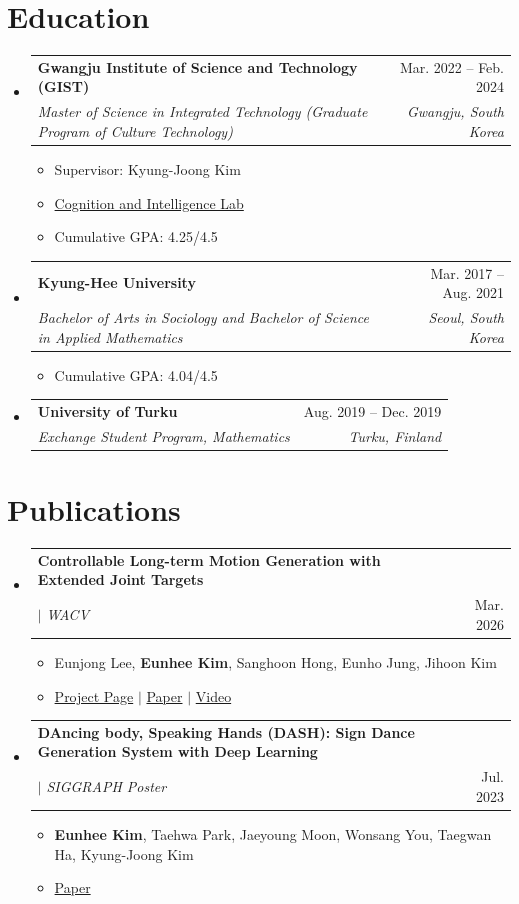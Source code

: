 \documentclass[letterpaper,11pt]{article}
\makeatletter
\newcommand{\resumeItem}[1]{
  \item\small{
    {#1 \vspace{-2pt}}
  }
}
\newcommand{\resumeSubheading}[4]{
  \vspace{-2pt}\item
    \begin{tabular*}{0.97\textwidth}[t]{l@{\extracolsep{\fill}}r}
      \textbf{#1} & #2 \\
      \textit{\small#3} & \textit{\small #4} \\
    \end{tabular*}\vspace{-7pt}
}
\newcommand{\resumeProjectHeading}[2]{
    \item
    \begin{tabular*}{0.97\textwidth}{l@{\extracolsep{\fill}}r}
      \small#1 & #2 \\
    \end{tabular*}\vspace{-7pt}
}
\newcommand{\resumeSubHeadingListStart}{\begin{itemize}[leftmargin=0.15in, label={}]}
\newcommand{\resumeSubHeadingListEnd}{\end{itemize}}
\newcommand{\resumeItemListStart}{\begin{itemize}}
\newcommand{\resumeItemListEnd}{\end{itemize}\vspace{-5pt}}
\makeatother
\begin{document}
\section{Education}
  \resumeSubHeadingListStart
    \resumeSubheading
      {Gwangju Institute of Science and Technology (GIST)}{Mar. 2022 -- Feb. 2024}
      {Master of Science in Integrated Technology (Graduate Program of Culture Technology)}{Gwangju, South Korea}
        \resumeItemListStart
          \resumeItem{Supervisor: Kyung-Joong Kim}
          \resumeItem{\href{https://cilab.gist.ac.kr/hp/}{Cognition and Intelligence Lab}}
          \resumeItem{Cumulative GPA: 4.25/4.5}
        \resumeItemListEnd
    \resumeSubheading
      {Kyung-Hee University}{Mar. 2017 -- Aug. 2021}
      {Bachelor of Arts in Sociology and Bachelor of Science in Applied Mathematics}{Seoul, South Korea}
      \resumeItemListStart
        \resumeItem{Cumulative GPA: 4.04/4.5}
      \resumeItemListEnd
    \resumeSubheading
      {University of Turku}{Aug. 2019 -- Dec. 2019}
      {Exchange Student Program, Mathematics}{Turku, Finland}
  \resumeSubHeadingListEnd

      


\section{Publications}
    \resumeSubHeadingListStart
      \resumeProjectHeading
          {\textbf{Controllable Long-term Motion Generation with Extended Joint Targets} 
          \\$|$ \emph{WACV}}{Mar. 2026}
          \resumeItemListStart
            \resumeItem{Eunjong Lee, \textbf{Eunhee Kim}, Sanghoon Hong, Eunho Jung, Jihoon Kim}
            \resumeItem{\href{https://comet-proj.github.io}{Project Page} $|$ \href{https://openaccess.thecvf.com/content/WACV2026/html/Lee_Controllable_Long-term_Motion_Generation_with_Extended_Joint_Targets_WACV_2026_paper.html}{Paper} $|$ \href{https://youtu.be/vZh8PwArOe0?si=MOItkrb3HT2LwRAU}{Video}}
          \resumeItemListEnd
      \resumeProjectHeading
          {\textbf{DAncing body, Speaking Hands (DASH): Sign Dance Generation System with Deep Learning} 
          \\ $|$ \emph{SIGGRAPH Poster}}{Jul. 2023}
          \resumeItemListStart
            \resumeItem{\textbf{Eunhee Kim}, Taehwa Park, Jaeyoung Moon, Wonsang You, Taegwan Ha, Kyung-Joong Kim}
            \resumeItem{\href{https://dl.acm.org/doi/abs/10.1145/3588028.3603687}{Paper}}
          \resumeItemListEnd
    \resumeSubHeadingListEnd
    
\end{document}
